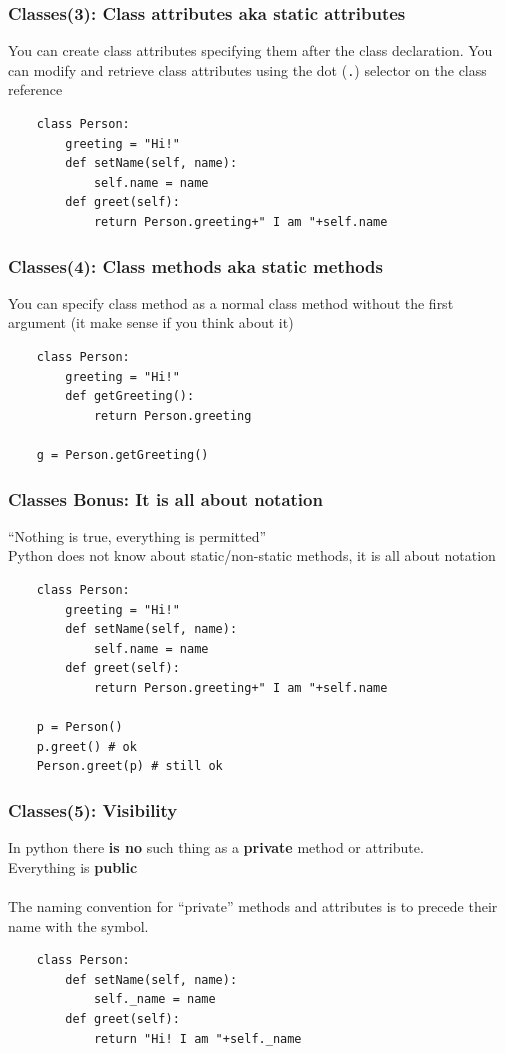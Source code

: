 \documentclass{beamer}
\begin{document}
\begin{frame}[fragile]
    \frametitle{Classes(3): Class attributes aka static attributes}
    You can create class attributes specifying them after the class declaration. 
    You can modify and retrieve class attributes using the dot (\texttt{.}) selector on the class reference
    \begin{verbatim}
    class Person:
        greeting = "Hi!"
        def setName(self, name):
            self.name = name
        def greet(self):
            return Person.greeting+" I am "+self.name
    \end{verbatim}
\end{frame}

\begin{frame}[fragile]
    \frametitle{Classes(4): Class methods aka static methods}
    You can specify class method as a normal class method without the first argument (it make sense if you think about it)
    \begin{verbatim}
    class Person:
        greeting = "Hi!"
        def getGreeting():
            return Person.greeting
    
    g = Person.getGreeting()
    \end{verbatim}
\end{frame}


\begin{frame}[fragile]
    \frametitle{Classes Bonus: It is all about notation}
    ``Nothing is true, everything is permitted''\\
    Python does not know about static/non-static methods, it is all about notation
    \begin{verbatim}
    class Person:
        greeting = "Hi!"
        def setName(self, name):
            self.name = name
        def greet(self):
            return Person.greeting+" I am "+self.name
    
    p = Person()
    p.greet() # ok
    Person.greet(p) # still ok
    \end{verbatim}
\end{frame}



\begin{frame}[fragile]
    \frametitle{Classes(5): Visibility}
    In python there \textbf{is no} such thing as a \textbf{private} method or attribute.\\
    Everything is \textbf{public}\\
    \hfill \\
    The naming convention for ``private'' methods and attributes is to precede their name with the \texttt{\textunderscore} symbol.
    \begin{verbatim}
    class Person:
        def setName(self, name):
            self._name = name
        def greet(self):
            return "Hi! I am "+self._name
    \end{verbatim}
\end{frame}
\end{document}
